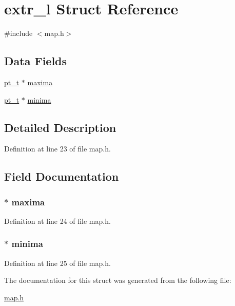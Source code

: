 \hypertarget{structextr__l}{\section{extr\-\_\-l Struct Reference}
\label{structextr__l}
}


{\ttfamily \#include $<$map.\-h$>$}

\subsection*{Data Fields}
\begin{DoxyCompactItemize}
\item 
\hyperlink{structpt__t}{pt\-\_\-t} $\ast$ \hyperlink{structextr__l_a1881a018328909aa59bc21b9aa6a4581}{maxima}
\item 
\hyperlink{structpt__t}{pt\-\_\-t} $\ast$ \hyperlink{structextr__l_a9c4c695197916c2480553e745e2ca701}{minima}
\end{DoxyCompactItemize}


\subsection{Detailed Description}


Definition at line 23 of file map.\-h.



\subsection{Field Documentation}
\hypertarget{structextr__l_a1881a018328909aa59bc21b9aa6a4581}{
\subsubsection[{maxima}]{$\ast$ maxima}}\label{structextr__l_a1881a018328909aa59bc21b9aa6a4581}


Definition at line 24 of file map.\-h.

\hypertarget{structextr__l_a9c4c695197916c2480553e745e2ca701}{
\subsubsection[{minima}]{$\ast$ minima}}\label{structextr__l_a9c4c695197916c2480553e745e2ca701}


Definition at line 25 of file map.\-h.



The documentation for this struct was generated from the following file\-:\begin{DoxyCompactItemize}
\item 
\hyperlink{map_8h}{map.\-h}\end{DoxyCompactItemize}
